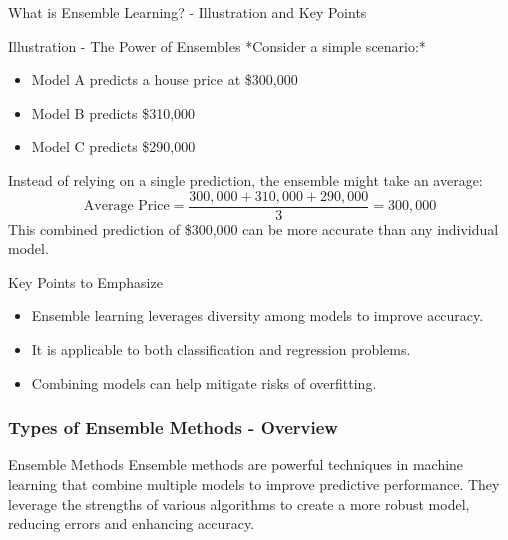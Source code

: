 \documentclass[aspectratio=169]{beamer}
\begin{document}
\begin{frame}[fragile]{What is Ensemble Learning? - Illustration and Key Points}
    \begin{block}{Illustration - The Power of Ensembles}
        *Consider a simple scenario:*
        \begin{itemize}
            \item Model A predicts a house price at \$300,000
            \item Model B predicts \$310,000
            \item Model C predicts \$290,000 
        \end{itemize}
        Instead of relying on a single prediction, the ensemble might take an average:
        \begin{equation}
            \text{Average Price} = \frac{300,000 + 310,000 + 290,000}{3} = 300,000
        \end{equation}
        This combined prediction of \$300,000 can be more accurate than any individual model.
    \end{block}

    \begin{block}{Key Points to Emphasize}
        \begin{itemize}
            \item Ensemble learning leverages diversity among models to improve accuracy.
            \item It is applicable to both classification and regression problems.
            \item Combining models can help mitigate risks of overfitting.
        \end{itemize}
    \end{block}
\end{frame}

\begin{frame}[fragile]
  \frametitle{Types of Ensemble Methods - Overview}
  \begin{block}{Ensemble Methods}
    Ensemble methods are powerful techniques in machine learning that combine multiple models to improve predictive performance. They leverage the strengths of various algorithms to create a more robust model, reducing errors and enhancing accuracy.
  \end{block}
\end{frame}
\end{document}
